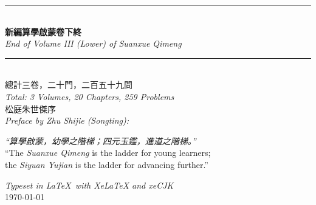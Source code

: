 \documentclass[11pt,a4paper]{article}
\newcommand{\longline}{\noindent\rule{\textwidth}{0.4pt}}
\begin{document}
\vspace{1cm}

\begin{center}
\longline\\[0.5cm]
{\fontsize{20}{24}\selectfont\bfseries\color{vol3color}
新編算學啟蒙卷下終}\\[0.5cm]
{\large\textit{End of Volume III (Lower) of Suanxue Qimeng}}\\[0.5cm]
\longline\\[1cm]
{\Large 總計三卷，二十門，二百五十九問}\\[0.3cm]
{\large\textit{Total: 3 Volumes, 20 Chapters, 259 Problems}}\\[1cm]
{\large 松庭朱世傑序}\\[0.3cm]
{\normalsize\textit{Preface by Zhu Shijie (Songting):}}\\[0.3cm]
\begin{minipage}{0.8\textwidth}
\centering
\textit{``算學啟蒙，幼學之階梯；四元玉鑑，進道之階梯。''}\\[0.3cm]
``The \textit{Suanxue Qimeng} is the ladder for young learners;\\
the \textit{Siyuan Yujian} is the ladder for advancing further.''
\end{minipage}
\end{center}

\vfill

\begin{center}
{\small\textit{Typeset in \LaTeX\ with \textsf{XeLaTeX} and \textup{xeCJK}}\\
\today}
\end{center}
\end{document}
